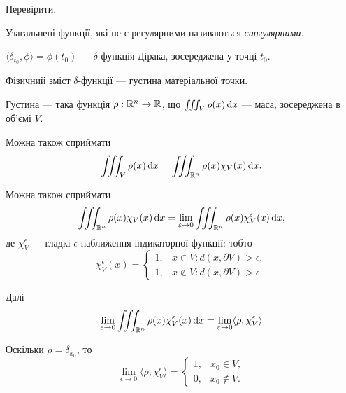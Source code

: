 \begin{exercise}
    Перевірити.
\end{exercise}

\begin{definition}
    Узагальнені функції, які не є регулярними називаються \textit{сингулярними}.
\end{definition}

\begin{definition}
    $\langle \delta_{t_0}, \phi \rangle = \phi(t_0)$ --- $\delta$ функція Дірака, зосереджена у точці $t_0$.
\end{definition}

\begin{remark}
    Фізичний зміст $\delta$-функції --- густина матеріальної точки.
\end{remark}

Густина --- така функція $\rho: \mathbb{R}^n \to \mathbb{R}$, що $\iiint_V \rho(x) \mathop{}\!\mathrm{d} x$ --- маса, зосереджена в об'ємі $V$. \medskip

Можна також сприймати
\begin{equation}
    \iiint_V \rho(x) \mathop{}\!\mathrm{d} x = \iiint_{\mathbb{R}^n} \rho(x) \chi_V(x) \mathop{}\!\mathrm{d} x.
\end{equation}

Можна також сприймати
\begin{equation}
    \iiint_{\mathbb{R}^n} \rho(x) \chi_V(x) \mathop{}\!\mathrm{d} x = \lim_{\varepsilon \to 0} \iiint_{\mathbb{R}^n} \rho(x) \chi_V^\varepsilon(x) \mathop{}\!\mathrm{d} x,
\end{equation}
де $\chi_V^\epsilon$ --- гладкі $\epsilon$-наближення індикаторної функції:
тобто
\begin{equation}
    \chi_V^\epsilon(x) = \begin{cases}
        1, & x \in V: d(x, \partial V) > \epsilon, \\
        1, & x \not\in V: d(x, \partial V) > \epsilon.
    \end{cases}
\end{equation}

Далі 
\begin{equation}
    \lim_{\varepsilon \to 0} \iiint_{\mathbb{R}^n} \rho(x) \chi_V^\varepsilon(x) \mathop{}\!\mathrm{d} x = \lim_{\varepsilon \to 0} \langle \rho, \chi_V^\varepsilon \rangle
\end{equation}

Оскільки $\rho = \delta_{x_0}$, то
\begin{equation}
    \lim_{\epsilon \to 0} \langle \rho, \chi_V^\epsilon \rangle = \begin{cases}
        1, & x_0 \in V, \\
        0, & x_0 \not\in V.
    \end{cases}
\end{equation}

